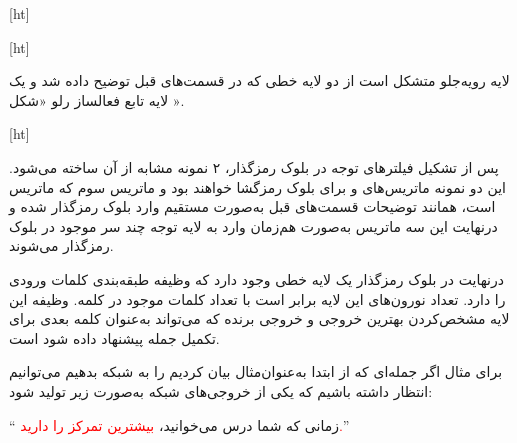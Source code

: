 [ht]



[ht]








لایه رو‌یه‌جلو متشکل است از دو لایه خطی که در قسمت‌های قبل توضیح داده شد و یک لایه تابع فعالساز رلو «شکل ».


[ht]




پس از تشکیل فیلترهای توجه در بلوک رمزگذار، ۲ نمونه مشابه از آن ساخته می‌شود. این دو نمونه ماتریس‌های  و  برای بلوک رمزگشا خواهند بود و ماتریس سوم که ماتریس  است، همانند توضیحات قسمت‌های قبل به‌صورت مستقیم وارد بلوک رمزگذار شده و درنهایت این سه ماتریس به‌صورت هم‌زمان وارد به لایه توجه چند سر موجود در بلوک رمزگذار می‌شوند.


درنهایت در بلوک رمزگذار یک لایه خطی وجود دارد که وظیفه طبقه‌بندی کلمات ورودی را دارد. تعداد نورون‌های این لایه برابر است با تعداد کلمات موجود در کلمه. وظیفه این لایه مشخص‌کردن بهترین خروجی و خروجی برنده که می‌تواند به‌عنوان کلمه بعدی برای تکمیل جمله پیشنهاد داده شود است.


برای مثال اگر جمله‌ای که از ابتدا به‌عنوان‌مثال بیان کردیم را به شبکه بدهیم می‌توانیم انتظار داشته باشیم که یکی از خروجی‌های شبکه به‌صورت زیر تولید شود:


`` زمانی که شما درس می‌خوانید، \textcolor{red}{بیشترین تمرکز را دارید.}''
